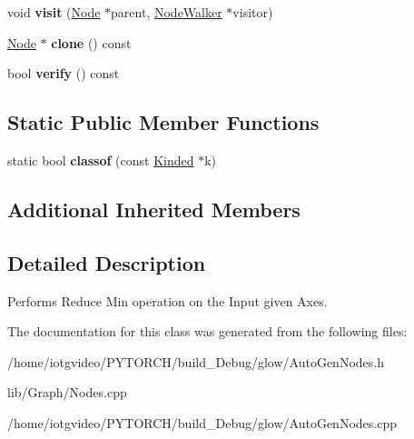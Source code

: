 \begin{DoxyCompactItemize}
\mbox{\label{classglow_1_1_batched_reduce_min_node_a26a6362b2c6fcceaddace3e1837aefa7}} 
void {\bfseries visit} (\hyperlink{classglow_1_1_node}{Node} $\ast$parent, \hyperlink{classglow_1_1_node_walker}{Node\+Walker} $\ast$visitor)
\item 
\mbox{\label{classglow_1_1_batched_reduce_min_node_af5ff85aaf06305a8b84cadbfad0ab4fe}} 
\hyperlink{classglow_1_1_node}{Node} $\ast$ {\bfseries clone} () const
\item 
\mbox{\label{classglow_1_1_batched_reduce_min_node_a762e856752669d8e3a746ca92598a34f}} 
bool {\bfseries verify} () const
\end{DoxyCompactItemize}
\subsection*{Static Public Member Functions}
\begin{DoxyCompactItemize}
\item 
\mbox{\label{classglow_1_1_batched_reduce_min_node_aa7ccf0b86fd01c4176a23f2332934c05}} 
static bool {\bfseries classof} (const \hyperlink{classglow_1_1_kinded}{Kinded} $\ast$k)
\end{DoxyCompactItemize}
\subsection*{Additional Inherited Members}


\subsection{Detailed Description}
Performs Reduce Min operation on the Input given Axes. 

The documentation for this class was generated from the following files\+:\begin{DoxyCompactItemize}
\item 
/home/iotgvideo/\+P\+Y\+T\+O\+R\+C\+H/build\+\_\+\+Debug/glow/Auto\+Gen\+Nodes.\+h\item 
lib/\+Graph/Nodes.\+cpp\item 
/home/iotgvideo/\+P\+Y\+T\+O\+R\+C\+H/build\+\_\+\+Debug/glow/Auto\+Gen\+Nodes.\+cpp\end{DoxyCompactItemize}
